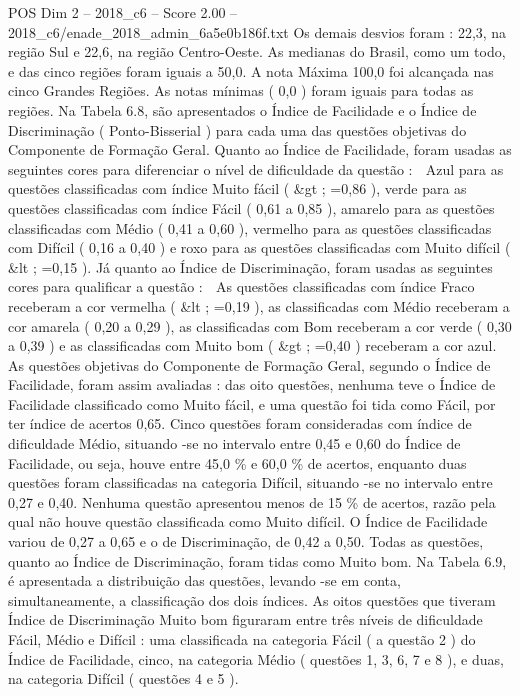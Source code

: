 \begin{textsample}{POS Dim 2 – 2018\_c6 – Score 2.00 – 2018\_c6/enade\_2018\_admin\_6a5e0b186f.txt}
Os demais desvios foram : 22,3, na região Sul e 22,6, na região Centro-Oeste.
As medianas do Brasil, como um todo, e das cinco regiões foram iguais a 50,0.
A nota Máxima 100,0 foi alcançada nas cinco Grandes Regiões.
As notas mínimas ( 0,0 ) foram iguais para todas as regiões.
Na Tabela 6.8, são apresentados o Índice de Facilidade e o Índice de Discriminação ( Ponto-Bisserial ) para cada uma das questões objetivas do Componente de Formação Geral.
Quanto ao Índice de Facilidade, foram usadas as seguintes cores para diferenciar o nível de dificuldade da questão :  Azul para as questões classificadas com índice Muito fácil ( \&gt ; =0,86 ), verde para as questões classificadas com índice Fácil ( 0,61 a 0,85 ), amarelo para as questões classificadas com Médio ( 0,41 a 0,60 ), vermelho para as questões classificadas com Difícil ( 0,16 a 0,40 ) e roxo para as questões classificadas com Muito difícil ( \&lt ; =0,15 ).
Já quanto ao Índice de Discriminação, foram usadas as seguintes cores para qualificar a questão :  As questões classificadas com índice Fraco receberam a cor vermelha ( \&lt ; =0,19 ), as classificadas com Médio receberam a cor amarela ( 0,20 a 0,29 ), as classificadas com Bom receberam a cor verde ( 0,30 a 0,39 ) e as classificadas com Muito bom ( \&gt ; =0,40 ) receberam a cor azul.
As questões objetivas do Componente de Formação Geral, segundo o Índice de Facilidade, foram assim avaliadas : das oito questões, nenhuma teve o Índice de Facilidade classificado como Muito fácil, e uma questão foi tida como Fácil, por ter índice de acertos 0,65.
Cinco questões foram consideradas com índice de dificuldade Médio, situando -se no intervalo entre 0,45 e 0,60 do Índice de Facilidade, ou seja, houve entre 45,0 \% e 60,0 \% de acertos, enquanto duas questões foram classificadas na categoria Difícil, situando -se no intervalo entre 0,27 e 0,40.
Nenhuma questão apresentou menos de 15 \% de acertos, razão pela qual não houve questão classificada como Muito difícil.
O Índice de Facilidade variou de 0,27 a 0,65 e o de Discriminação, de 0,42 a 0,50.
Todas as questões, quanto ao Índice de Discriminação, foram tidas como Muito bom.
Na Tabela 6.9, é apresentada a distribuição das questões, levando -se em conta, simultaneamente, a classificação dos dois índices.
As oitos questões que tiveram Índice de Discriminação Muito bom figuraram entre três níveis de dificuldade Fácil, Médio e Difícil : uma classificada na categoria Fácil ( a questão 2 ) do Índice de Facilidade, cinco, na categoria Médio ( questões 1, 3, 6, 7 e 8 ), e duas, na categoria Difícil ( questões 4 e 5 ).

\end{textsample}
